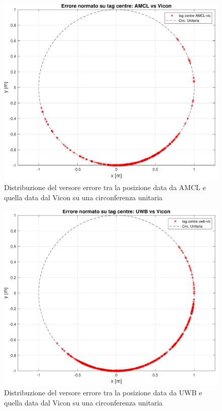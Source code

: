 
\begin{figure}[] 
	\centering    
	\includegraphics[height=.3\textheight]{grafici_stanzavolo_vicon/figure16.pdf}
	\caption{Distribuzione del versore errore tra la posizione data da AMCL e quella data dal Vicon su una circonferenza unitaria}
	\label{fig: err_norm_amclvic_sphere_vicon_charlie}
\end{figure}

\begin{figure}[] 
	\centering    
	\includegraphics[height=.3\textheight]{grafici_stanzavolo_vicon/figure15.pdf}
	\caption{Distribuzione del versore errore tra la posizione data da UWB e quella data dal Vicon su una circonferenza unitaria}
	\label{fig: err_norm_uwbvic_sphere_vicon_charlie}
\end{figure}

